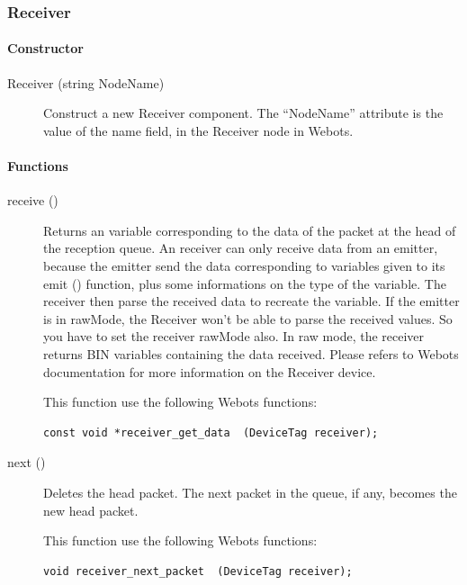 \subsubsection{Receiver}
\label{webots.uobjects.robotdevices.receiver}%

\paragraph{Constructor}
\label{webots.uobjects.robotdevices.receiver.constructor}%

\noindent
\begin{description}
\item[{Receiver (string NodeName)}] Construct a new Receiver component. The ``NodeName'' attribute is the value
          of the name field, in the Receiver node in Webots.

\end{description}

\paragraph{Functions}
\label{webots.uobjects.robotdevices.receiver.functions}%

\noindent
\begin{description}
\item[{receive ()}] Returns an \urbi variable corresponding to the data
  of the packet at the head of the reception queue. An \urbi receiver
  can only receive data from an \urbi emitter, because the \urbi emitter
  send the data corresponding to \urbi variables given to its emit ()
  function, plus some informations on the type of the variable. The
  receiver then parse the received data to recreate the \urbi variable.
  If the \urbi emitter is in rawMode, the Receiver won't be able to
  parse the received values.  So you have to set the receiver rawMode
  also. In raw mode, the receiver returns BIN variables containing the
  data received.  Please refers to Webots documentation for more
  information on the Receiver device.


          This function use the following Webots functions:


\begin{lstlisting}
const void *receiver_get_data  (DeviceTag receiver);
\end{lstlisting}
\item[{next ()}]           Deletes the head packet. The next packet in the queue, if any, becomes the
           new head packet.


          This function use the following Webots functions:


\begin{lstlisting}
void receiver_next_packet  (DeviceTag receiver);
\end{lstlisting}
\end{description}

